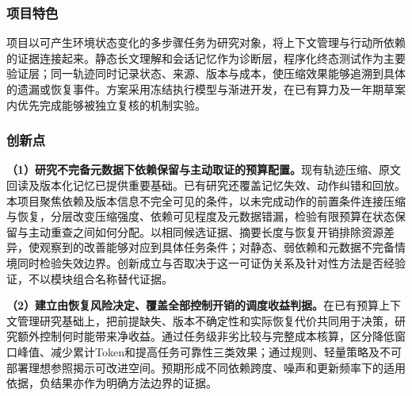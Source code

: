 \justifying
\NSFCBodyText

\subsubsection{项目特色}
项目以可产生环境状态变化的多步骤任务为研究对象，将上下文管理与行动所依赖的证据连接起来。静态长文理解和会话记忆作为诊断层，程序化终态测试作为主要验证层；同一轨迹同时记录状态、来源、版本与成本，使压缩效果能够追溯到具体的遗漏或恢复事件。方案采用冻结执行模型与渐进开发，在已有算力及一年期草案内优先完成能够被独立复核的机制实验。

\subsubsection{创新点}
\textbf{（1）研究不完备元数据下依赖保留与主动取证的预算配置。}现有轨迹压缩、原文回读及版本化记忆已提供重要基础。已有研究还覆盖记忆失效、动作纠错和回放。本项目聚焦依赖及版本信息不完全可见的条件，以未完成动作的前置条件连接压缩与恢复，分层改变压缩强度、依赖可见程度及元数据错漏，检验有限预算在状态保留与主动重查之间如何分配。以相同候选证据、摘要长度与恢复开销排除资源差异，使观察到的改善能够对应到具体任务条件；对静态、弱依赖和元数据不完备情境同时检验失效边界。创新成立与否取决于这一可证伪关系及针对性方法是否经验证，不以模块组合名称替代证据。

\textbf{（2）建立由恢复风险决定、覆盖全部控制开销的调度收益判据。}在已有预算上下文管理研究基础上，把前提缺失、版本不确定性和实际恢复代价共同用于决策，研究额外控制何时能带来净收益。通过任务级非劣比较与完整成本核算，区分降低窗口峰值、减少累计Token和提高任务可靠性三类效果；通过规则、轻量策略及不可部署理想参照揭示可改进空间。预期形成不同依赖跨度、噪声和更新频率下的适用依据，负结果亦作为明确方法边界的证据。

